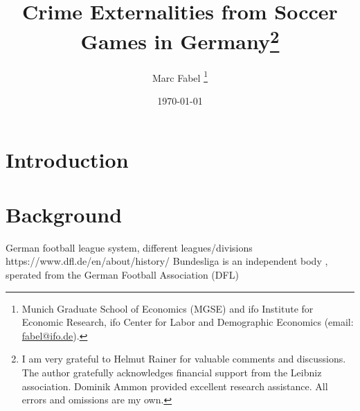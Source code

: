 \documentclass[11pt, a4paper]{article} %
\title{Crime Externalities from Soccer Games in Germany\footnote{I am very grateful to Helmut Rainer for valuable comments and discussions. The author gratefully acknowledges financial support from the Leibniz association. Dominik Ammon provided excellent research assistance. All errors and omissions are my own.
}}
\author{
	Marc Fabel 
		\thanks{Munich Graduate School of Economics (MGSE) and ifo Institute for Economic Research, ifo Center for Labor and Demographic Economics (email: \href{mailto:fabel@ifo.de}{fabel@ifo.de}).
		}
}
\date{\monthyeardate\today}
\begin{document}
\setcounter{page}{0}  
\newpage
\setcounter{page}{1}    
\maketitle



\bigskip
\tableofcontents

\newpage


\section{Introduction}\label{sec_soc_ext:introduction}






\bigskip
\section{Background}\label{sec_soc_ext:background}

German football league system, different leagues/divisions
https://www.dfl.de/en/about/history/
Bundesliga is an independent body , sperated from the German Football Association (DFL)

\end{document}
